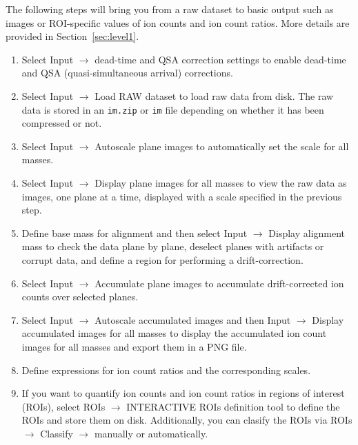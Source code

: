 \documentclass[a4paper, 11pt]{article}
\newcommand{\ttt}[1]{\texttt{#1}}
\newcommand{\lans}[1]{{\color{magenta}#1}}
\newcommand{\lanscb}[1]{{\color{darkgreen}#1}}
\newcommand{\lanstf}[1]{{\color{cyan}#1}}
\newcommand\ra{\rightarrow}
\newcounter{step}
\begin{document}
The following steps will bring you from a raw dataset to basic output such as images or ROI-specific values of ion counts and ion count ratios. More details are provided in Section~\ref{sec:level1}.

\begin{enumerate}

\item Select \lans{Input} $\ra$ \lans{dead-time and QSA correction settings} to enable dead-time and QSA (quasi-simultaneous arrival) corrections.

\item Select \lans{Input} $\ra$ \lans{Load RAW dataset} to load raw data from disk. The raw data is stored in an \ttt{im.zip} or \ttt{im} file depending on whether it has been compressed or not.

\item Select \lans{Input} $\ra$ \lans{Autoscale plane images} to automatically set the scale for all masses. 

\item Select \lans{Input} $\ra$ \lans{Display plane images for all masses} to view the raw data as images, one plane at a time, displayed with a scale specified in the previous step. 

\item Define \lanstf{base mass for alignment} and then select \lans{Input} $\ra$ \lans{Display alignment mass} to check the data plane by plane, \lanscb{deselect planes} with artifacts or corrupt data, and \lans{define a region} for performing a drift-correction. 

\item Select \lans{Input} $\ra$ \lans{Accumulate plane images} to accumulate drift-corrected ion counts over selected planes.  

\item Select \lans{Input} $\ra$ \lans{Autoscale accumulated images} and then \lans{Input} $\ra$ \lans{Display accumulated images for all masses} to display the accumulated ion count images for all masses and export them in a PNG file.

\item Define \lanstf{expressions} for ion count ratios and the corresponding \lanstf{scales}. 

\item If you want to quantify ion counts and ion count ratios in regions of interest (ROIs), select \lans{ROIs} $\ra$ \lans{INTERACTIVE ROIs definition tool} to define the ROIs and store them on disk. Additionally, you can clasify the ROIs via \lans{ROIs} $\ra$ \lans{Classify} $\ra$ \lans{manually} or \lans{automatically}.


\end{enumerate}
\end{document}
